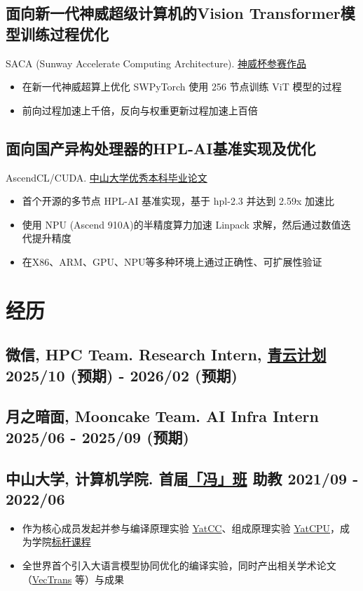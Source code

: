 \documentclass[
    scheme=plain
]{ctexart}
\newcommand{\datedsubsection}[2]{%
\subsection[#1]{#1 \hfill #2}
}
\begin{document}
\datedsubsection{\textbf{面向新一代神威超级计算机的Vision Transformer模型训练过程优化}}{}

SACA (Sunway Accelerate Computing Architecture).
\href{https://sysu-scc.feishu.cn/file/boxcnsEncoYfL79hceRLrAP11Jg}{神威杯参赛作品}

\begin{itemize}
  \item 在新一代神威超算上优化 SWPyTorch 使用 256 节点训练 ViT 模型的过程
  \item 前向过程加速上千倍，反向与权重更新过程加速上百倍
\end{itemize}

\datedsubsection{\textbf{面向国产异构处理器的HPL-AI基准实现及优化}}{}

AscendCL/CUDA. \href{https://wu-kan.cn/2021/03/14/HPL-AI/}{中山大学优秀本科毕业论文}

\begin{itemize}
  \item 首个开源的多节点 HPL-AI 基准实现，基于 hpl-2.3 并达到 2.59x 加速比
  \item 使用 NPU (Ascend 910A)的半精度算力加速 Linpack 求解，然后通过数值迭代提升精度
  \item 在X86、ARM、GPU、NPU等多种环境上通过正确性、可扩展性验证
\end{itemize}

\section{经历}

\datedsubsection{\textbf{微信}, HPC Team. Research Intern, \href{https://mp.weixin.qq.com/s?__biz=MTkyNTM0MzA4MQ==&mid=2650961684&idx=1&sn=45c1e4c4da50169027a689a8c27effb5}{青云计划}}{2025/10 (预期) - 2026/02 (预期)}

\datedsubsection{\textbf{月之暗面}, Mooncake Team. AI Infra Intern}{2025/06 - 2025/09 (预期)}

\datedsubsection{\textbf{中山大学}, 计算机学院. 首届\href{https://cse.sysu.edu.cn/article/2314}{「冯」班}
助教}{2021/09 - 2022/06}

\begin{itemize}
  \item 作为核心成员发起并参与编译原理实验 \href{https://yatcc-ai.com/}{YatCC}、组成原理实验 \href{https://yatcpu.sysu.tech/}{YatCPU}，成为学院\href{https://mp.weixin.qq.com/s?__biz=MzAwNzczODEzMw==&mid=2653124398&idx=1&sn=b2d2f2b4aa4ca8fd8937385aa0da45d7}{标杆课程}
  \item 全世界首个引入大语言模型协同优化的编译实验，同时产出相关学术论文（\href{https://arxiv.org/abs/2503.19449}{VecTrans} 等）与成果
\end{itemize}
\end{document}
